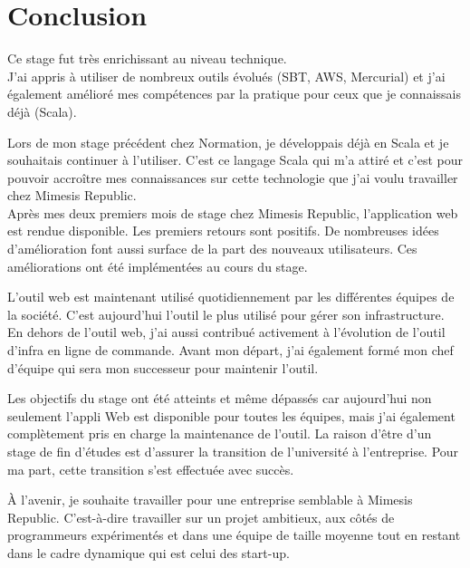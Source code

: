 \chapter{Conclusion}

Ce stage fut très enrichissant au niveau technique.\\
J'ai appris à utiliser de nombreux outils évolués (SBT, AWS, Mercurial)
et j'ai également amélioré mes compétences par la pratique pour ceux que je
connaissais déjà (Scala).

Lors de mon stage précédent chez Normation, je développais déjà en Scala et je
souhaitais continuer à l'utiliser. C'est ce langage Scala qui m'a attiré et
c'est pour pouvoir accroître mes connaissances sur cette technologie que j'ai
voulu travailler chez Mimesis Republic.\\

Après mes deux premiers mois de stage chez Mimesis Republic, l'application web
est rendue disponible.
Les premiers retours sont positifs. De nombreuses idées d'amélioration font
aussi surface de la part des nouveaux utilisateurs.
Ces améliorations ont été implémentées au cours du stage.

L'outil web est maintenant utilisé quotidiennement par les différentes équipes
de la société. C'est aujourd'hui l'outil le plus utilisé pour gérer son
infrastructure. En dehors de l'outil web, j'ai aussi contribué activement à
l'évolution de l'outil d'infra en ligne de commande.
Avant mon départ, j'ai également formé mon chef d'équipe qui sera mon successeur
pour maintenir l'outil.

Les objectifs du stage ont été atteints et même dépassés car aujourd'hui non
seulement l'appli Web est disponible pour toutes les équipes, mais j'ai
également complètement pris en charge la maintenance de l'outil. 
La raison d'être d'un stage de fin d'études est d'assurer la transition de
l'université à l'entreprise. Pour ma part, cette transition s'est effectuée avec
succès.

À l'avenir, je souhaite travailler pour une entreprise semblable à Mimesis
Republic. C'est-à-dire travailler sur un projet ambitieux, aux côtés de
programmeurs expérimentés et dans une équipe de taille moyenne tout en restant
dans le cadre dynamique qui est celui des start-up.



